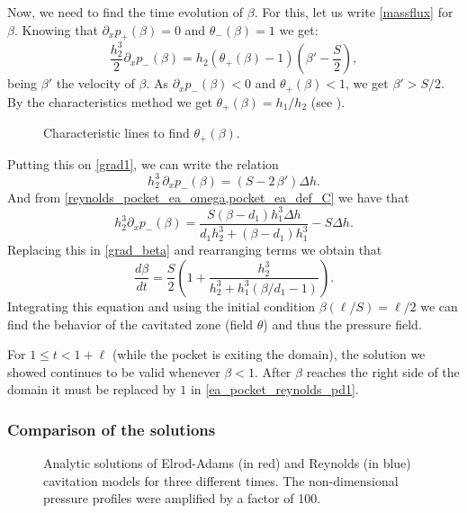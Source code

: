 Now, we need to find the time evolution of $\beta$. For this, let us write \eqref{massflux} for $\beta$. Knowing that $\partial_x p_+(\beta)=0$ and $\theta_-(\beta)=1$ we get:
\begin{equation}
\frac{h_2^3}{2}\partial_x p_-(\beta)=h_2\left(\theta_+(\beta)-1\right)\left(\beta'-\frac{S}{2}\right),\label{eq:grad1}
\end{equation}
being $\beta'$ the velocity of $\beta$. As $\partial_x p_-(\beta)<0$ and $\theta_+(\beta)<1$, we get $\beta'> S/2$. By the characteristics method we get $\theta_+(\beta)=h_1/h_2$ (see ).
\begin{figure}[ht!]
 \centering 
 \def\svgwidth{\textwidth}	
\caption{Characteristic lines to find $\theta_+(\beta)$.}\label{fig:char_beta}
\end{figure}

 Putting this on \eqref{grad1}, we can write the relation
 \begin{equation}
 h_2^3\,\partial_x p_-(\beta) = (S-2\,\beta')\Delta h.\label{eq:grad_beta}
 \end{equation}
And from \eqref{reynolds_pocket_ea_omega,pocket_ea_def_C} we have that
$$h_2^3\partial_x p_-(\beta)=\frac{S(\beta-d_1)h_1^3\Delta h}{d_1h_2^3+(\beta-d_1)h_1^3}-S\Delta h.$$
Replacing this in \eqref{grad_beta} and rearranging terms we obtain that
\begin{equation}
\frac{d\beta}{dt}=\frac{S}{2}\left(1+\frac{h_2^3}{h_2^3+h_1^3(\beta/d_1-1)}\right).\label{eq:dbdt}
\end{equation}
Integrating this equation and using the initial condition $\beta(\ell/S)=\ell/2$ we can find the behavior of the cavitated zone (field $\theta$) and thus the pressure field.

For $1\leq t <1 +\ell$ (while the pocket is exiting the domain), the solution we showed continues to be valid whenever $\beta<1$. After $\beta$ reaches the right side of the domain it must be replaced by $1$ in \eqref{ea_pocket_reynolds_pd1}.
\subsubsection*{Comparison of the solutions}

\begin{figure}[ht!]
 \centering 
 \def\svgwidth{\textwidth}	

\caption[Analytic solutions of Elrod-Adams and Reynolds cavitation models for three different times of the traveling pocket]{Analytic solutions of Elrod-Adams (in red) and Reynolds (in blue) cavitation models for three different times. The non-dimensional pressure profiles were amplified by a factor of 100.}\label{fig:pockets_analytic}
\end{figure}

